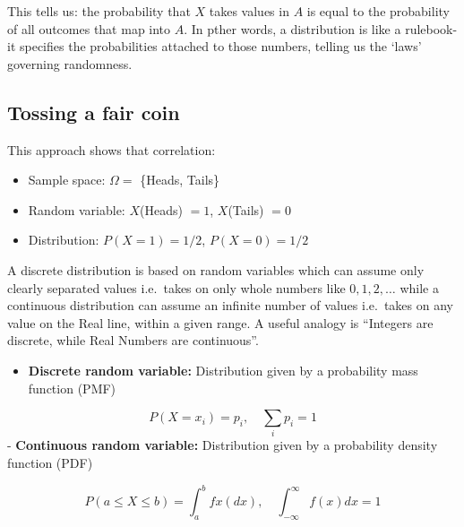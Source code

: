 \documentclass[
  letterpaper,
  DIV=11,
  numbers=noendperiod]{scrreprt}
\providecommand{\tightlist}{%
  \setlength{\itemsep}{0pt}\setlength{\parskip}{0pt}}
\begin{document}
This tells us: the probability that \(X\) takes values in \(A\) is equal
to the probability of all outcomes that map into \(A\). In pther words,
a distribution is like a rulebook-it specifies the probabilities
attached to those numbers, telling us the `laws' governing randomness.

\subsection{Tossing a fair coin}\label{tossing-a-fair-coin}

This approach shows that correlation:

\begin{itemize}
\tightlist
\item
  Sample space: \(\Omega =\) \{Heads, Tails\}
\item
  Random variable: \(X\)(Heads) \(=1\), \(X\)(Tails) \(=0\)\\
\item
  Distribution: \(P(X=1)=1/2\), \(P(X=0)=1/2\)
\end{itemize}

A discrete distribution is based on random variables which can assume
only clearly separated values i.e.~takes on only whole numbers like
\(0, 1, 2, \dots\) while a continuous distribution can assume an
infinite number of values i.e.~takes on any value on the Real line,
within a given range. A useful analogy is ``Integers are discrete, while
Real Numbers are continuous''.

\begin{tcolorbox}[enhanced jigsaw, coltitle=black, colbacktitle=quarto-callout-important-color!10!white, left=2mm, bottomrule=.15mm, bottomtitle=1mm, colback=white, titlerule=0mm, colframe=quarto-callout-important-color-frame, breakable, leftrule=.75mm, toptitle=1mm, opacitybacktitle=0.6, rightrule=.15mm, title=\textcolor{quarto-callout-important-color}{\faExclamation}\hspace{0.5em}{Discrete vs.~Continious}, arc=.35mm, opacityback=0, toprule=.15mm]

\begin{itemize}
\tightlist
\item
  \textbf{Discrete random variable:} Distribution given by a probability
  mass function (PMF)
\end{itemize}

\[
P(X=x_i) = p_i, \quad \sum_i p_i = 1
\] - \textbf{Continuous random variable:} Distribution given by a
probability density function (PDF)

\[
P(a \leq X \leq b) = \int_a^b fx(dx), \quad \int_{-\infty}^{\infty} f(x)dx=1
\]

\end{tcolorbox}
\end{document}

